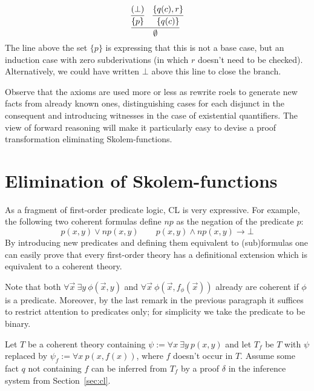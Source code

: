 \documentclass[12pt]{article}
\newcommand{\weg}[1]{\medskip}
\newcommand{\ra}{\rightarrow}
\newcommand{\set}[1]{\{#1\}}
\newcommand{\Tf}{T_{\!f}}
\newcommand{\psif}{\psi_{\!f}}
\begin{document}
\[
\infer{\emptyset}
{
\infer{\set{p}}{(\bot)} & \infer{\set{q(c)}}{\set{q(c),r}}
}
\]
The line above the set $\set{p}$ is expressing that this is 
not a base case, but an induction case with zero subderivations
(in which $r$ doesn't need to be checked). 
Alternatively, we could have written $\bot$ above this line
to close the branch.

Observe that the axioms are used more or less as rewrite roels
to generate new facts
from already known ones, distinguishing cases
for each disjunct in the consequent and introducing witnesses
in the case of existential quantifiers.
The view of forward reasoning will make it particularly easy to
devise a proof transformation eliminating Skolem-functions.
 
\weg{and reasoning in CL is constructive
in the sense of intuitionistic logic.
Completeness proofs can be found in~\cite{Beze:Coqu:04,Beze:Coqu:05}.
We have implemented the CL proof procedure in Prolog, 
see~\cite[\url{CL.pl}]{Beze:Hend:05}. 
The implementation generates {\coq} proof scripts.
This does not increase the size of the trusted core of {\coq}.
Elaborated examples of the reasoning mechanism are given in 
Section~\ref{sec:machine} and in the appendix.
}%

\section{Elimination of Skolem-functions}

As a fragment of first-order predicate logic, CL is very expressive. 
For example, the following two coherent formulas define
$np$ as the negation of the predicate $p$:
\[p(x,y)\vee np(x,y) \quad\quad p(x,y)\wedge np(x,y)\ra\bot\]
By introducing new predicates and defining them equivalent to (sub)formulas
one can easily prove that every first-order theory has a definitional extension
which is equivalent to a coherent theory.

Note that both $\forall\vec{x}~\exists y~ \phi(\vec{x},y)$
and $\forall\vec{x}~\phi(\vec{x},f_\phi(\vec{x}))$
already are coherent if $\phi$ is a predicate.
Moreover, by the last remark in the previous paragraph it suffices to
restrict attention to predicates only; for simplicity
we take the predicate to be binary.

Let $T$ be a coherent theory containing
$\psi:=\forall x~\exists y~p(x,y)$ and let $\Tf$ be $T$ with
$\psi$ replaced by $\psif:=\forall x~p(x,f(x))$,
where $f$ doesn't occur in $T$.
Assume some fact $q$ not containing $f$ can be inferred
from $\Tf$ by a proof $\delta$ 
in the inference system from Section~\ref{sec:cl}.
\end{document}
